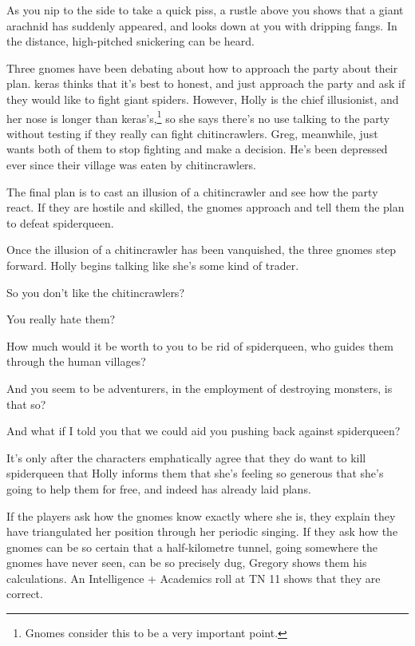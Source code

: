 \begin{multicols}{2}
\begin{boxtext}
	As you nip to the side to take a quick piss, a rustle above you shows that a giant arachnid has suddenly appeared, and looks down at you with dripping fangs.  In the distance, high-pitched snickering can be heard.

\end{boxtext}

Three gnomes have been debating about how to approach the party about their plan.
\Gls{keras} thinks that it's best to honest, and just approach the party and ask if they would like to fight giant spiders.
However, Holly is the chief illusionist, and her nose is longer than \gls{keras}'s,\footnote{Gnomes consider this to be a very important point.} so she says there's no use talking to the party without testing if they really can fight chitincrawlers.
Greg, meanwhile, just wants both of them to stop fighting and make a decision.
He's been depressed ever since their village was eaten by chitincrawlers.

The final plan is to cast an illusion of a chitincrawler and see how the party react.  If they are hostile and skilled, the gnomes approach and tell them the plan to defeat \gls{spiderqueen}.

Once the illusion of a chitincrawler has been vanquished, the three gnomes step forward.
Holly begins talking like she's some kind of trader.

\begin{speechtext}

	So you don't like the chitincrawlers?

	You really hate them?

	How much would it be worth to you to be rid of \gls{spiderqueen}, who guides them through the human villages?

	And you seem to be adventurers, in the employment of destroying monsters, is that so?

	And what if I told you that we could aid you pushing back against \gls{spiderqueen}?

\end{speechtext}

It's only after the characters emphatically agree that they do want to kill \gls{spiderqueen} that Holly informs them that she's feeling so generous that she's going to help them for free, and indeed has already laid plans.

If the players ask how the gnomes know exactly where she is, they explain they have triangulated her position through her periodic singing.
If they ask how the gnomes can be so certain that a half-kilometre tunnel, going somewhere the gnomes have never seen, can be so precisely dug, Gregory shows them his calculations.
An Intelligence + Academics roll at TN 11 shows that they are correct.


\end{multicols}
